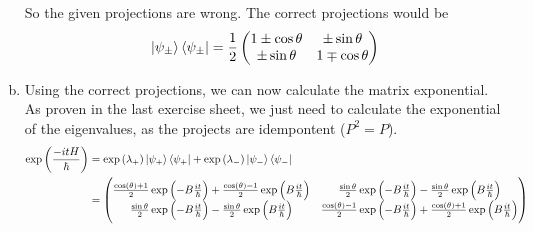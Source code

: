 \documentclass[a4paper,german,12pt,smallheadings]{scrartcl}
\begin{document}
\begin{enumerate}[a)]
    So the given projections are wrong. The correct projections would be
    \begin{equation*}
      \ket{\psi_\pm} \bra{\psi_\pm} = \frac{1}{2} \begin{pmatrix}
        1 \pm \cos \theta & \pm \sin \theta \\
        \pm \sin \theta & 1 \mp \cos \theta
      \end{pmatrix}
    \end{equation*}
  \item
    Using the correct projections, we can now calculate the matrix exponential.
    As proven in the last exercise sheet, we just need to calculate the
    exponential of the eigenvalues, as the projects are idempontent ($P^2 =
    P$).
    \begin{align*}
      \exp\del{\frac{-itH}{\hbar}} &= \exp\del{\lambda_+} \ket{\psi_+}\bra{\psi_+} + \exp\del{\lambda_-} \ket{\psi_-}\bra{\psi_-} \\
                                   &= 
      \begin{pmatrix}
        \frac{\cos(\theta) + 1}{2} \exp\del{-B\frac{it}{\hbar}} + \frac{\cos(\theta) - 1}{2} \exp\del{B\frac{it}{\hbar}} &
        \frac{\sin\theta}{2} \exp\del{-B\frac{it}{\hbar}} - \frac{\sin\theta}{2} \exp\del{B\frac{it}{\hbar}} \\
        \frac{\sin\theta}{2} \exp\del{-B\frac{it}{\hbar}} - \frac{\sin\theta}{2} \exp\del{B\frac{it}{\hbar}} &
        \frac{\cos(\theta) - 1}{2} \exp\del{-B\frac{it}{\hbar}} + \frac{\cos(\theta) + 1}{2} \exp\del{B\frac{it}{\hbar}}
      \end{pmatrix}
    \end{align*}


\end{enumerate}
\end{document}
